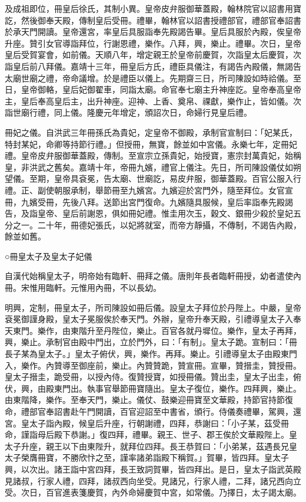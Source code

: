 及成祖即位，冊皇后徐氏，其制小異。皇帝皮弁服御華蓋殿，翰林院官以詔書用寶訖，然後御奉天殿，傳制皇后受冊。禮畢，翰林官以詔書授禮部官，禮部官奉詔書於承天門開讀。皇帝還宮，率皇后具服詣奉先殿謁告畢。皇后具服於內殿，俟皇帝升座。贊引女官導詣拜位，行謝恩禮，樂作。八拜，興，樂止。禮畢。次日，皇帝皇后受賀宴會，如前儀。天順八年，增定親王於皇帝前慶賀，次詣皇太后慶賀，次詣皇后前八拜儀。嘉靖十三年，冊皇后方氏，禮臣具儀注，有謁告內殿儀，無謁告太廟世廟之禮，帝命議增。於是禮臣以儀上。先期齋三日，所司陳設如時祫儀。至日，皇帝御輅，皇后妃御翟車，同詣太廟。命官奉七廟主升神座訖。皇帝奉高皇帝主，皇后奉高皇后主，出升神座。迎神、上香、奠帛、祼獻，樂作止，皆如儀。次詣世廟行禮，同上儀。隆慶元年增定，頒詔次日，命婦行見皇后禮。

冊妃之儀。自洪武三年冊孫氏為貴妃，定皇帝不御殿，承制官宣制曰：「妃某氏，特封某妃，命卿等持節行禮。」但授冊，無寶，餘並如中宮儀。永樂七年，定冊妃禮。皇帝皮弁服御華蓋殿，傳制。至宣宗立孫貴妃，始授寶，憲宗封萬貴妃，始稱皇，非洪武之舊矣。嘉靖十年，帝冊九嬪，禮官上儀注。先日，所司陳設儀仗如朔望儀。至期，皇帝具袞冕，告太廟、世廟訖，易皮弁服，御華蓋殿。百官公服入行禮。正、副使朝服承制，舉節冊至九嬪宮。九嬪迎於宮門外，隨至拜位。女官宣冊，九嬪受冊，先後八拜。送節出宮門復命。九嬪隨具服候，皇后率詣奉先殿謁告，及詣皇帝、皇后前謝恩，俱如冊妃禮。惟圭用次玉，穀文、銀冊少殺於皇妃五分之一。二十年，冊德妃張氏，以妃將就室，而帝方靜攝，不傳制，不謁告內殿，餘並如舊。

○冊皇太子及皇太子妃儀

自漢代始稱皇太子，明帝始有臨軒、冊拜之儀。唐則年長者臨軒冊授，幼者遣使內冊。宋惟用臨軒。元惟用內冊，不以長幼。

明興，定制，冊皇太子，所司陳設如冊后儀。設皇太子拜位於丹陛上。中嚴，皇帝袞冕御謹身殿，皇太子冕服俟於奉天門。外辦，皇帝升奉天殿，引禮導皇太子入奉天東門。樂作，由東階升至丹陛位，樂止。百官各就丹墀位。樂作，皇太子再拜，興，樂止。承制官由殿中門出，立於門外，曰：「有制」。皇太子跪。宣制曰：「冊長子某為皇太子。」皇太子俯伏，興，樂作。再拜。樂止。引禮導皇太子由殿東門入，樂作。內贊導至御座前，樂止。內贊贊跪，贊宣冊。宣畢，贊搢圭，贊授冊。皇太子搢圭，跪受冊，以授內侍。復贊授寶，如授冊儀。贊出圭，皇太子出圭，俯伏，興，由殿東門出。執事官舉節冊寶隨出。皇太子復位，樂作。四拜興，樂止。由東階降，樂作。至奉天門，樂止。儀仗、鼓樂迎冊寶至文華殿，持節官持節復命，禮部官奉詔書赴午門開讀，百官迎詔至中書省，頒行。侍儀奏禮畢，駕興，還宮。皇太子詣內殿，候皇后升座，行朝謝禮，四拜，恭謝曰：「小子某，茲受冊命，謹詣母后殿下恭謝。」復四拜，禮畢。親王、世子、郡王俟於文華殿陛上。皇太子升座，親王以下由東陛升，就拜位四拜。長王恭賀曰：「小弟某，茲遇長兄皇太子榮膺冊寶，不勝欣忭之至，謹率諸弟詣殿下稱賀。」賀畢，皆四拜。皇太子興，以次出。諸王詣中宮四拜，長王致詞賀畢，皆四拜出。是日，皇太子詣武英殿見諸叔，行家人禮，四拜，諸叔西向坐受。見諸兄，行家人禮，二拜，諸兄西向立受。次日，百官進表箋慶賀，內外命婦慶賀中宮，如常儀。乃擇日，太子謁太廟。

